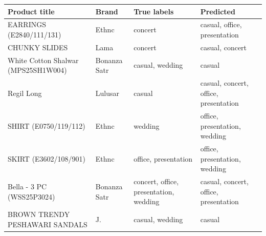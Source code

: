 \begin{tabular}{p{3.6cm}p{2.0cm}p{4.2cm}p{4.2cm}}
\toprule
Product title & Brand & True labels & Predicted \\
\midrule
EARRINGS (E2840/111/131) & Ethnc & concert & casual, office, presentation \\
CHUNKY SLIDES & Lama & concert & casual, concert \\
White Cotton Shalwar (MPS25SH1W004) & Bonanza Satr & casual, wedding & casual \\
Regil Long & Lulusar & casual & casual, concert, office, presentation \\
SHIRT (E0750/119/112) & Ethnc & wedding & office, presentation, wedding \\
SKIRT (E3602/108/901) & Ethnc & office, presentation & office, presentation, wedding \\
Bella - 3 PC (WSS25P3024) & Bonanza Satr & concert, office, presentation, wedding & casual, concert, office, presentation \\
BROWN TRENDY PESHAWARI SANDALS & J. & casual, wedding & casual \\
\bottomrule
\end{tabular}
